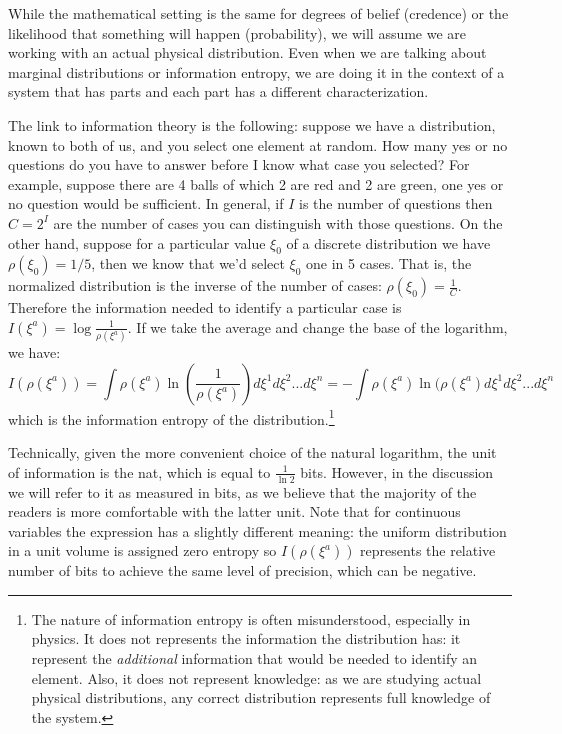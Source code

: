\documentclass[11pt]{article}
\begin{document}
While the mathematical setting is the same for degrees of belief (credence) or the likelihood that something will happen (probability), we will assume we are working with an actual physical distribution. Even when we are talking about marginal distributions or information entropy, we are doing it in the context of a system that has parts and each part has a different characterization.

The link to information theory is the following: suppose we have a distribution, known to both of us, and you select one element at random. How many yes or no questions do you have to answer before I know what case you selected? For example, suppose there are 4 balls of which 2 are red and 2 are green, one yes or no question would be sufficient. In general, if $I$ is the number of questions then $C = 2 ^ I$ are the number of cases you can distinguish with those questions. On the other hand, suppose for a particular value $\xi_0$ of a discrete distribution we have $\rho(\xi_0)=1/5$, then we know that we'd select $\xi_0$ one in 5 cases. That is, the normalized distribution is the inverse of the number of cases: $\rho(\xi_0) = \frac{1}{C}$.  Therefore the information needed to identify a particular case is $I(\xi^a)=\log \frac{1}{\rho(\xi^a)}$. If we take the average and change the base of the logarithm, we have:
\begin{equation}
I(\rho(\xi^a)) = \int \rho(\xi^a) \ln \left(\frac{1}{\rho(\xi^a)}\right) d\xi^1 d\xi^2 ... d\xi^n =-\int \rho(\xi^a) \ln (\rho(\xi^a) d\xi^1 d\xi^2 ... d\xi^n
\end{equation}
which is the information entropy of the distribution.\footnote{The nature of information entropy is often misunderstood, especially in physics. It does not represents the information the distribution has: it represent the \emph{additional} information that would be needed to identify an element. Also, it does not represent knowledge: as we are studying actual physical distributions, any correct distribution represents full knowledge of the system.}

Technically, given the more convenient choice of the natural logarithm, the unit of information is the nat, which is equal to $\frac{1}{\ln 2}$ bits. However, in the discussion we will refer to it as measured in bits, as we believe that the majority of the readers is more comfortable with the latter unit. Note that for continuous variables the expression has a slightly different meaning: the uniform distribution in a unit volume is assigned zero entropy so $I(\rho(\xi^a))$ represents the relative number of bits to achieve the same level of precision, which can be negative.
\end{document}
